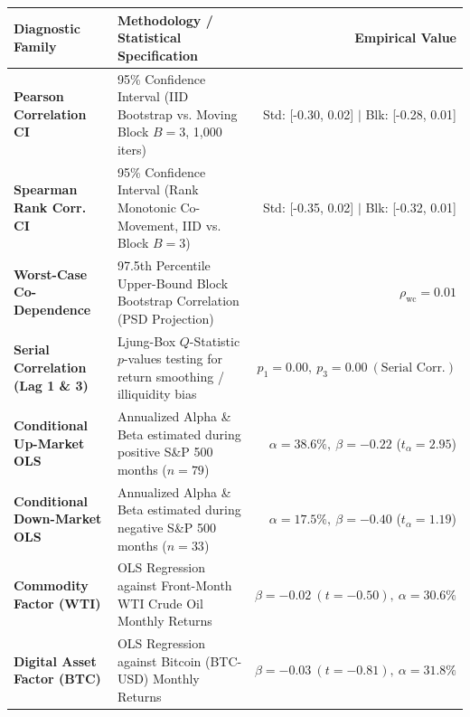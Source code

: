 \documentclass[10pt,a4paper]{article}
\begin{document}
\vspace{0.45em}

\begin{tcolorbox}[colback=white, colframe=primary, title=\textbf{\small\strut Appendix A: Extended Statistical, Bootstrap \& Factor Diagnostics}, fonttitle=\sffamily\bfseries\small, arc=5pt, boxrule=0.8pt, toptitle=4pt, bottomtitle=4pt, left=6pt, right=6pt, top=3.5pt, bottom=3.5pt, colbacktitle=primary]
\renewcommand{\arraystretch}{1.22}
\scriptsize
\begin{tabularx}{\textwidth}{l X r}
\toprule
\textbf{\textcolor{primary}{Diagnostic Family}} & \textbf{\textcolor{primary}{Methodology / Statistical Specification}} & \textbf{\textcolor{primary}{Empirical Value}} \\
\midrule
\textbf{Pearson Correlation CI} & 95\% Confidence Interval (IID Bootstrap vs. Moving Block $B=3$, 1,000 iters) & Std: [-0.30, 0.02] $\vert$ Blk: [-0.28, 0.01] \\
\rowcolor{cardbg} \textbf{Spearman Rank Corr. CI} & 95\% Confidence Interval (Rank Monotonic Co-Movement, IID vs. Block $B=3$) & Std: [-0.35, 0.02] $\vert$ Blk: [-0.32, 0.01] \\
\textbf{Worst-Case Co-Dependence} & 97.5th Percentile Upper-Bound Block Bootstrap Correlation (PSD Projection) & $\rho_{\text{wc}} = 0.01$ \\
\rowcolor{cardbg} \textbf{Serial Correlation (Lag 1 \& 3)} & Ljung-Box $Q$-Statistic $p$-values testing for return smoothing / illiquidity bias & $p_1=0.00,\ p_3=0.00\ (\text{Serial Corr.})$ \\
\textbf{Conditional Up-Market OLS} & Annualized Alpha \& Beta estimated during positive S\&P 500 months ($n=79$) & $\alpha=38.6\%,\ \beta=-0.22$ ($t_\alpha=2.95$) \\
\rowcolor{cardbg} \textbf{Conditional Down-Market OLS} & Annualized Alpha \& Beta estimated during negative S\&P 500 months ($n=33$) & $\alpha=17.5\%,\ \beta=-0.40$ ($t_\alpha=1.19$) \\
\textbf{Commodity Factor (WTI)} & OLS Regression against Front-Month WTI Crude Oil Monthly Returns & $\beta=-0.02\ (t=-0.50),\ \alpha=30.6\%$ \\
\rowcolor{cardbg} \textbf{Digital Asset Factor (BTC)} & OLS Regression against Bitcoin (BTC-USD) Monthly Returns & $\beta=-0.03\ (t=-0.81),\ \alpha=31.8\%$ \\
\bottomrule
\end{tabularx}
\end{tcolorbox}
\end{document}
